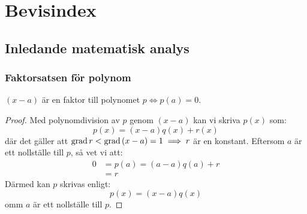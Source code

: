 \section{Bevisindex}

\subsection{Inledande matematisk analys}

\subsubsection{Faktorsatsen för polynom}
\begin{theorem}
	$(x-a)$ är en faktor till polynomet $p\iff p(a)=0$.

	\begin{proof}
		Med polynomdivision av $p$ genom $(x-a)$ kan vi skriva $p(x)$ som:
		$$
			p(x)=(x-a)q(x)+r(x)
		$$
		där det gäller att $\mathrm{grad}\, r<\mathrm{grad}\, (x-a)=1\implies r$ är en konstant.
		Eftersom $a$ är ett nollställe till $p$, så vet vi att:
		\begin{align*}
			0&=p(a)=(a-a)q(a)+r\\
			&=r
		\end{align*}
		Därmed kan $p$ skrivas enligt:
		$$
			p(x)=(x-a)q(x)
		$$
		omm $a$ är ett nollställe till $p$.
	\end{proof}
\end{theorem}

